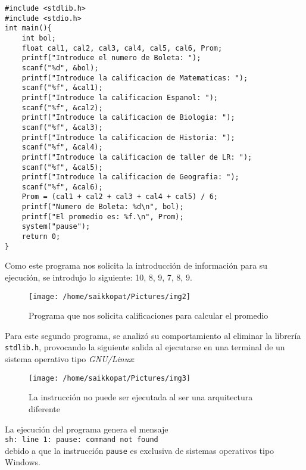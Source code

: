\documentclass[a4paper,12pt]{report}
\begin{document}
\begin{lstlisting}
#include <stdlib.h>
#include <stdio.h>
int main(){
	int bol;
	float cal1, cal2, cal3, cal4, cal5, cal6, Prom;
	printf("Introduce el numero de Boleta: ");
	scanf("%d", &bol);
	printf("Introduce la calificacion de Matematicas: ");
	scanf("%f", &cal1);
	printf("Introduce la calificacion Espanol: ");
	scanf("%f", &cal2);
	printf("Introduce la calificacion de Biologia: ");
	scanf("%f", &cal3);
	printf("Introduce la calificacion de Historia: ");
	scanf("%f", &cal4);
	printf("Introduce la calificacion de taller de LR: ");
	scanf("%f", &cal5);
	printf("Introduce la calificacion de Geografia: ");
	scanf("%f", &cal6);
	Prom = (cal1 + cal2 + cal3 + cal4 + cal5) / 6;
	printf("Numero de Boleta: %d\n", bol);
	printf("El promedio es: %f.\n", Prom);
	system("pause");
	return 0;
}
\end{lstlisting}

\vspace{0.5cm}

Como este programa nos solicita la introducción de información para su ejecución, se introdujo lo siguiente: 10, 8, 9, 7, 8, 9.\\

\vspace{0.5cm}

\begin{figure}[htp]
	\centering
	\texttt{[image: /home/saikkopat/Pictures/img2]}
	\caption{Programa que nos solicita calificaciones para calcular el promedio}
\end{figure}

\vspace{0.5cm}

Para este segundo programa, se analizó su comportamiento al eliminar la librería \verb+stdlib.h+, provocando la siguiente salida al ejecutarse en una terminal de un sistema operativo tipo \emph{GNU/Linux}:\\

\vspace{0.5cm}

\begin{figure}[H]
	\texttt{[image: /home/saikkopat/Pictures/img3]}
	\caption{La instrucción no puede ser ejecutada al ser una arquitectura diferente}
\end{figure}

\vspace{0.5cm}

La ejecución del programa genera el mensaje\\ \verb+sh: line 1: pause: command not found+\\ debido a que la instrucción \verb+pause+ es exclusiva de sistemas operativos tipo Windows\textregistered.\\
\end{document}
